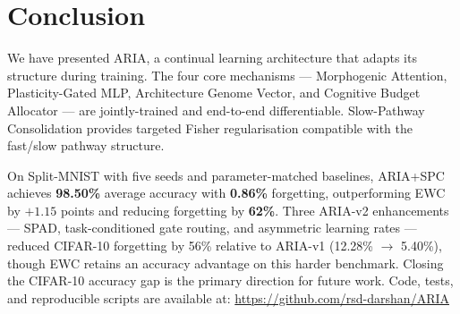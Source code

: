 \documentclass[10pt,twocolumn]{article}
\begin{document}
\section{Conclusion}
\label{sec:conclusion}

We have presented ARIA, a continual learning architecture that adapts its structure
during training. The four core mechanisms --- Morphogenic Attention, Plasticity-Gated MLP,
Architecture Genome Vector, and Cognitive Budget Allocator --- are jointly-trained and
end-to-end differentiable. Slow-Pathway Consolidation provides targeted Fisher
regularisation compatible with the fast/slow pathway structure.

On Split-MNIST with five seeds and parameter-matched baselines, ARIA+SPC achieves
\textbf{98.50\%} average accuracy with \textbf{0.86\%} forgetting, outperforming EWC
by $+1.15$ points and reducing forgetting by \textbf{62\%}. Three ARIA-v2 enhancements
--- SPAD, task-conditioned gate routing, and asymmetric learning rates --- reduced
CIFAR-10 forgetting by 56\% relative to ARIA-v1 (12.28\% $\to$ 5.40\%), though EWC
retains an accuracy advantage on this harder benchmark. Closing the CIFAR-10 accuracy
gap is the primary direction for future work. Code, tests, and reproducible scripts
are available at: \url{https://github.com/rsd-darshan/ARIA}
\end{document}
